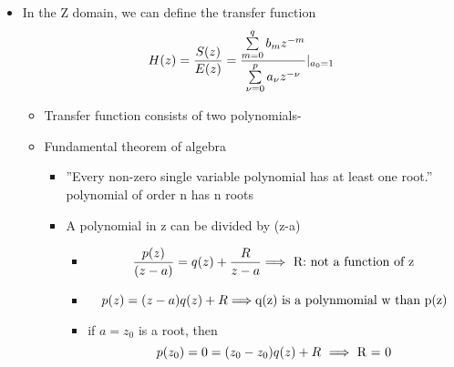 \begin{itemize}
\item In the Z domain, we can define the transfer function 
\begin{equation}\MakeUppercase{\filterFunc}(z)  = \frac{\MakeUppercase{\filtOutFunc}(z)}{\MakeUppercase{\excitationFunc}(z)} = \frac{ \sum\limits^{\maFiltOrder}_{\maConvIndex = 0}\maFiltCoef_{\maConvIndex }z^{-\maConvIndex}}{\sum\limits^{\arFiltOrder}_{\arConvIndex = 0}\arFiltCoef_{\arConvIndex }z^{-\arConvIndex}}     |_{a_0 = 1}\end{equation}



\begin{itemize}
\item Transfer function consists of two polynomials-

\item Fundamental theorem of algebra

\begin{itemize}

\item  ''Every non-zero single variable polynomial has at least one root.''  polynomial of order n has n roots

\item A polynomial in z can be divided by (z-a)

\begin{itemize}

\item \begin{equation*}  \frac{p(z)}{(z-a)} = q(z) + \frac{R}{z-a}\mbox{\begin{math}\implies\end{math} R: not a function of z}\end{equation*}

\item \begin{equation*}p(z) = (z-a)q(z) + R\mbox{\begin{math}\implies\end{math}q(z) is a polynmomial w than p(z)}\end{equation*}

\item if \begin{math} a = z_0\end{math} is a root, then
\begin{equation*}p(z_0) = 0 =  (z_0-z_0)q(z) + R\mbox{ \begin{math}\implies\end{math}  R = 0}\end{equation*}


\end{itemize}
\end{itemize}
\end{itemize}
\end{itemize}

